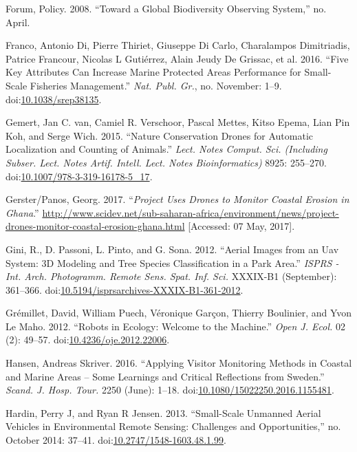 \documentclass[]{interact}
\theoremstyle{plain}%
\theoremstyle{definition}
\theoremstyle{remark}
\begin{document}
\hypertarget{ref-forum_toward_2008}{}
Forum, Policy. 2008. ``Toward a Global Biodiversity Observing System,''
no. April.

\hypertarget{ref-franco_five_2016}{}
Franco, Antonio Di, Pierre Thiriet, Giuseppe Di Carlo, Charalampos
Dimitriadis, Patrice Francour, Nicolas L Gutiérrez, Alain Jeudy De
Grissac, et al. 2016. ``Five Key Attributes Can Increase Marine
Protected Areas Performance for Small-Scale Fisheries Management.''
\emph{Nat. Publ. Gr.}, no. November: 1--9.
doi:\href{https://doi.org/10.1038/srep38135}{10.1038/srep38135}.

\hypertarget{ref-van_gemert_nature_2015}{}
Gemert, Jan C. van, Camiel R. Verschoor, Pascal Mettes, Kitso Epema,
Lian Pin Koh, and Serge Wich. 2015. ``Nature Conservation Drones for
Automatic Localization and Counting of Animals.'' \emph{Lect. Notes
Comput. Sci. (Including Subser. Lect. Notes Artif. Intell. Lect. Notes
Bioinformatics)} 8925: 255--270.
doi:\href{https://doi.org/10.1007/978-3-319-16178-5_17}{10.1007/978-3-319-16178-5\_17}.

\hypertarget{ref-Georg2016}{}
Gerster/Panos, Georg. 2017. ``\emph{Project Uses Drones to Monitor
Coastal Erosion in Ghana}.''
\url{http://www.scidev.net/sub-saharan-africa/environment/news/project-drones-monitor-coastal-erosion-ghana.html}
{[}Accessed: 07 May, 2017{]}.

\hypertarget{ref-gini_aerial_2012}{}
Gini, R., D. Passoni, L. Pinto, and G. Sona. 2012. ``Aerial Images from
an Uav System: 3D Modeling and Tree Species Classification in a Park
Area.'' \emph{ISPRS - Int. Arch. Photogramm. Remote Sens. Spat. Inf.
Sci.} XXXIX-B1 (September): 361--366.
doi:\href{https://doi.org/10.5194/isprsarchives-XXXIX-B1-361-2012}{10.5194/isprsarchives-XXXIX-B1-361-2012}.

\hypertarget{ref-gremillet_robots_2012}{}
Grémillet, David, William Puech, Véronique Garçon, Thierry Boulinier,
and Yvon Le Maho. 2012. ``Robots in Ecology: Welcome to the Machine.''
\emph{Open J. Ecol.} 02 (2): 49--57.
doi:\href{https://doi.org/10.4236/oje.2012.22006}{10.4236/oje.2012.22006}.

\hypertarget{ref-hansen_applying_2016}{}
Hansen, Andreas Skriver. 2016. ``Applying Visitor Monitoring Methods in
Coastal and Marine Areas -- Some Learnings and Critical Reflections from
Sweden.'' \emph{Scand. J. Hosp. Tour.} 2250 (June): 1--18.
doi:\href{https://doi.org/10.1080/15022250.2016.1155481}{10.1080/15022250.2016.1155481}.

\hypertarget{ref-hardin_small-scale_2013}{}
Hardin, Perry J, and Ryan R Jensen. 2013. ``Small-Scale Unmanned Aerial
Vehicles in Environmental Remote Sensing: Challenges and
Opportunities,'' no. October 2014: 37--41.
doi:\href{https://doi.org/10.2747/1548-1603.48.1.99}{10.2747/1548-1603.48.1.99}.
\end{document}
